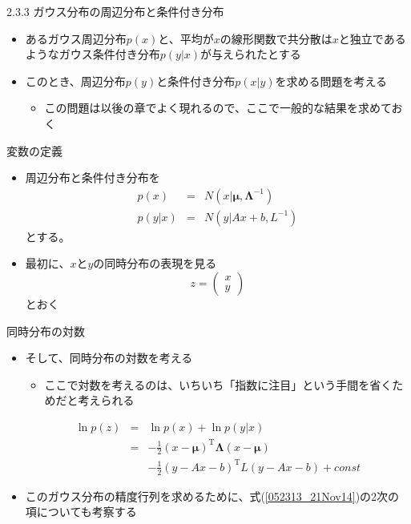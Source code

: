 \begin{frame}{2.3.3 ガウス分布の周辺分布と条件付き分布}
 \begin{itemize}
  \item あるガウス周辺分布$p(x)$と、平均が$x$の線形関数で共分散は$x$と独立であるようなガウス条件付き分布$p(y|x)$が与えられたとする
  \item このとき、周辺分布$p(y)$と条件付き分布$p(x|y)$を求める問題を考える
        \begin{itemize}
         \item この問題は以後の章でよく現れるので、ここで一般的な結果を求めておく
        \end{itemize}
 \end{itemize}
\end{frame}

\begin{frame}{変数の定義}
 \begin{itemize}
  \item 周辺分布と条件付き分布を
        \begin{eqnarray}
         p(x) &=& N(x|\bm{\mu} , \bm{\Lambda}^{-1})\\
         p(y|x) &=& N(y|Ax+b, L^{-1})
        \end{eqnarray}
        とする。
  \item 最初に、$x$と$y$の同時分布の表現を見る
        \begin{equation}
         z = \begin{pmatrix}
              x \\
              y
             \end{pmatrix}
        \end{equation}
        とおく
 \end{itemize}
\end{frame}

\begin{frame}{同時分布の対数}
 \begin{itemize}
  \item そして、同時分布の対数を考える
  \begin{itemize}
   \item ここで対数を考えるのは、いちいち「指数に注目」という手間を省くためだと考えられる
  \end{itemize}
        \begin{eqnarray}
         \ln p(z) &=& \ln p(x) + \ln p(y|x) \nonumber \\
         &= & -\frac{1}{2}(x-\bm{\mu})^{\mathrm{T}}\bm{\Lambda}(x-\bm{\mu}) \nonumber \\
         &&-\frac{1}{2}(y-Ax-b)^{\mathrm{T}}L(y-Ax-b)+const\label{052313_21Nov14}
        \end{eqnarray}
  \item このガウス分布の精度行列を求めるために、式(\ref{052313_21Nov14})の2次の項についても考察する
 \end{itemize}
\end{frame}

